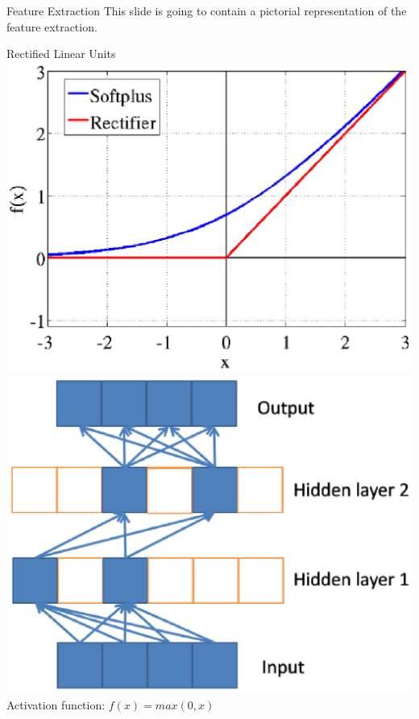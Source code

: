\documentclass{beamer}
\begin{document}
\begin{frame}{Feature Extraction}
This slide is going to contain a pictorial representation of the feature extraction. 
\end{frame}

\begin{frame}{Rectified Linear Units}
\includegraphics[scale=0.3]{Figures/ReLU-acts.eps}
\includegraphics[scale=0.3]{Figures/ReLU-grads.eps}
\\
Activation function: $f(x) = max(0,x)$
\end{frame}
\end{document}

